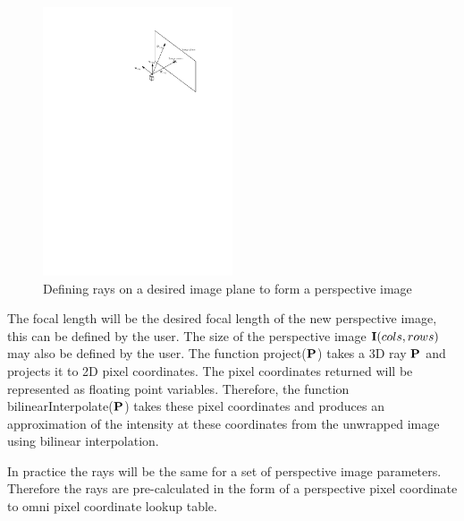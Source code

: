 \begin{figure}[h!]
  \centering
    \includegraphics[width=0.5\textwidth]{chapters/images/omni_perspective}
  \caption{Defining rays on a desired image plane to form a perspective image}
  \label{fig:omni_perspective}
\end{figure}

The focal length will be the desired focal length of the new perspective image, this can be defined by the user.  The size of the perspective image $\mathbf I(cols, rows)$ may also be defined by the user.  The function project($\mathbf P$) takes a 3D ray $\mathbf P$ and projects it to 2D pixel coordinates.  The pixel coordinates returned will be represented as floating point variables.  Therefore, the function bilinearInterpolate($\mathbf P$) takes these pixel coordinates and produces an approximation of the intensity at these coordinates from the unwrapped image using bilinear interpolation.

In practice the rays will be the same for a set of perspective image parameters.  Therefore the rays are pre-calculated in the form of a perspective pixel coordinate to omni pixel coordinate lookup table.

